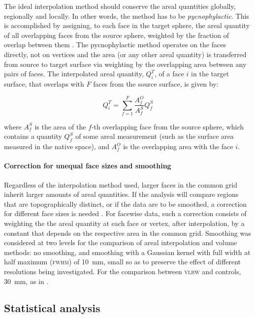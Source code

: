 The ideal interpolation method should conserve the areal quantities globally, regionally and locally. In other words, the method has to be \emph{pycnophylactic}. This is accomplished by assigning, to each face in the target sphere, the areal quantity of all overlapping faces from the source sphere, weighted by the fraction of overlap between them \citep{Markoff1973, Winkler2012}. The pycnophylactic method operates on the faces directly, not on vertices and the area (or any other areal quantity) is transferred from source to target surface via weighting by the overlapping area between any pairs of faces. The interpolated areal quantity, $Q^{T}_{i}$, of a face $i$ in the target surface, that overlaps with $F$ faces from the source surface, is given by:

$$
Q^{T}_{i} = \sum_{f=1}^{F} \frac{A^{O}_{f}}{A^{S}_{f}} Q^{S}_{f}
$$

\noindent
where $A^{S}_{f}$ is the area of the $f$-th overlapping face from the source sphere, which contains a quantity $Q^{S}_{f}$ of some areal measurement (such as the surface area measured in the native space), and $A^{O}_{f}$ is the overlapping area with the face $i$.

\paragraph{Correction for unequal face sizes and smoothing}

Regardless of the interpolation method used, larger faces in the common grid inherit larger amounts of areal quantities. If the analysis will compare regions that are topographically distinct, or if the data are to be smoothed, a correction for different face sizes is needed \citep{Winkler2012}. For facewise data, such a correction consists of weighting the the areal quantity at each face or vertex, after interpolation, by a constant that depends on the respective area in the common grid. Smoothing was considered at two levels for the comparison of areal interpolation and volume methods: no smoothing, and smoothing with a Gaussian kernel with full width at half maximum (\textsc{fwhm}) of 10~mm, small so as to preserve the effect of different resolutions being investigated. For the comparison between \textsc{vlbw} and controls, 30~mm, as in \citet{Skranes2013}.

\subsection{Statistical analysis}

